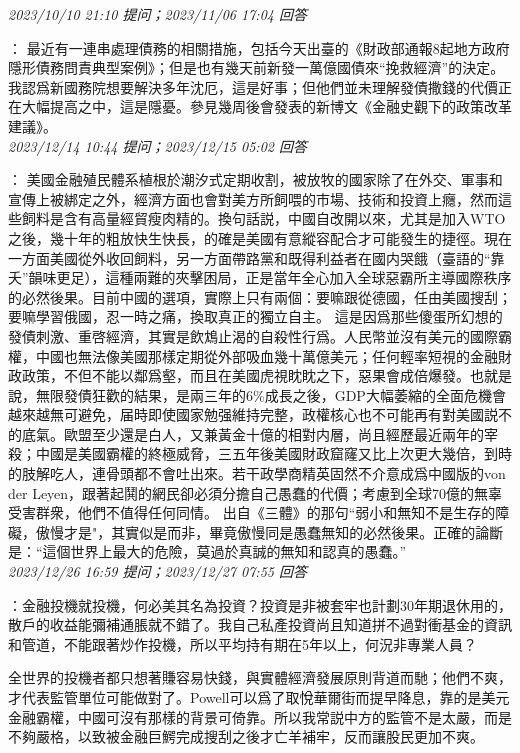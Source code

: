 \documentclass[twocolumn]{ctexart}
\begin{document}
\textit{\hfill\noindent\small 2023/10/10 21:10 提问；2023/11/06 17:04 回答}

：
最近有一連串處理債務的相關措施，包括今天出臺的《財政部通報8起地方政府隱形債務問責典型案例》；但是也有幾天前新發一萬億國債來“挽救經濟”的決定。
我認爲新國務院想要解決多年沈厄，這是好事；但他們並未理解發債撒錢的代價正在大幅提高之中，這是隱憂。參見幾周後會發表的新博文《金融史觀下的政策改革建議》。
\\

\textit{\hfill\noindent\small 2023/12/14 10:44 提问；2023/12/15 05:02 回答}

：
美國金融殖民體系植根於潮汐式定期收割，被放牧的國家除了在外交、軍事和宣傳上被綁定之外，經濟方面也會對美方所飼喂的市場、技術和投資上癮，然而這些飼料是含有高量經貿瘦肉精的。換句話説，中國自改開以來，尤其是加入WTO之後，幾十年的粗放快生快長，的確是美國有意縱容配合才可能發生的捷徑。現在一方面美國從外收回飼料，另一方面帶路黨和既得利益者在國内哭餓（臺語的“靠夭”韻味更足），這種兩難的夾擊困局，正是當年全心加入全球惡霸所主導國際秩序的必然後果。目前中國的選項，實際上只有兩個：要嘛跟從德國，任由美國搜刮；要嘛學習俄國，忍一時之痛，換取真正的獨立自主。
這是因爲那些傻蛋所幻想的發債刺激、重啓經濟，其實是飲鴆止渴的自殺性行爲。人民幣並沒有美元的國際霸權，中國也無法像美國那樣定期從外部吸血幾十萬億美元；任何輕率短視的金融財政政策，不但不能以鄰爲壑，而且在美國虎視眈眈之下，惡果會成倍爆發。也就是說，無限發債狂歡的結果，是兩三年的6\%成長之後，GDP大幅萎縮的全面危機會越來越無可避免，届時即使國家勉强維持完整，政權核心也不可能再有對美國説不的底氣。歐盟至少還是白人，又兼黃金十億的相對内層，尚且經歷最近兩年的宰殺；中國是美國霸權的終極威脅，三五年後美國財政窟窿又比上次更大幾倍，到時的肢解吃人，連骨頭都不會吐出來。若干政學商精英固然不介意成爲中國版的von der Leyen，跟著起鬨的網民卻必須分擔自己愚蠢的代價；考慮到全球70億的無辜受害群衆，他們不值得任何同情。
出自《三體》的那句“弱小和無知不是生存的障礙，傲慢才是"，其實似是而非，畢竟傲慢同是愚蠢無知的必然後果。正確的論斷是：“這個世界上最大的危險，莫過於真誠的無知和認真的愚蠢。”
\\

\textit{\hfill\noindent\small 2023/12/26 16:59 提问；2023/12/27 07:55 回答}

：金融投機就投機，何必美其名為投資？投資是非被套牢也計劃30年期退休用的，散戶的收益能彌補通脹就不錯了。我自己私產投資尚且知道拼不過對衝基金的資訊和管道，不能跟著炒作投機，所以平均持有期在5年以上，何況非專業人員？

全世界的投機者都只想著賺容易快錢，與實體經濟發展原則背道而馳；他們不爽，才代表監管單位可能做對了。Powell可以爲了取悅華爾街而提早降息，靠的是美元金融霸權，中國可沒有那樣的背景可倚靠。所以我常説中方的監管不是太嚴，而是不夠嚴格，以致被金融巨鰐完成搜刮之後才亡羊補牢，反而讓股民更加不爽。
\\
\end{document}
